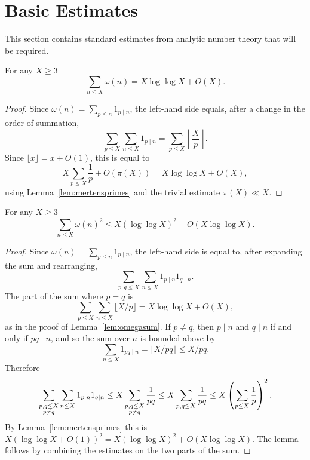 \chapter{Basic Estimates}
\label{chap:basic}

This section contains standard estimates from analytic number theory that will be required.

\begin{lemma}\label{lem:omegasum}
  \leanok
For any $X\geq 3$
\[\sum_{n\leq X}\omega(n) = X\log\log X+O(X).\]
\end{lemma}
\begin{proof}
  \leanok
Since $\omega(n) = \sum_{p\leq n}1_{p\mid n}$, the left-hand side equals, after a change in the order of summation,
\[\sum_{p\leq X}\sum_{n\leq X}1_{p\mid n} = \sum_{p\leq X}\left\lfloor\frac{X}{p}\right\rfloor.\]
Since $\lfloor x\rfloor=x+O(1)$, this is equal to
\[X\sum_{p\leq X}\frac{1}{p} +O(\pi(X)) = X\log\log X+O(X),\]
using Lemma~\ref{lem:mertensprimes} and the trivial estimate $\pi(X)\ll X$.
\end{proof}

\begin{lemma}\label{lem:omegasquaredsum}
  \leanok
For any $X\geq 3$
\[\sum_{n\leq X}\omega(n)^2 \leq X(\log\log X)^2+O(X\log\log X).\]
\end{lemma}
\begin{proof}
  \leanok
Since $\omega(n) = \sum_{p\leq n}1_{p\mid n}$, the left-hand side is equal to, after expanding the sum and rearranging,
\[\sum_{p,q\leq X}\sum_{n\leq X}1_{p\mid n}1_{q\mid n}.\]
The part of the sum where $p=q$ is
\[\sum_{p\leq X}\sum_{n\leq X}\lfloor X/p\rfloor = X\log\log X+O(X),\]
as in the proof of Lemma~\ref{lem:omegasum}. If $p\neq q$, then $p\mid n$ and $q\mid n$ if and only if $pq\mid n$, and so the sum over $n$ is bounded above by
\[\sum_{n\leq X}1_{pq\mid n}= \lfloor X/pq\rfloor \leq X/pq.\]
Therefore
\[\sum_{\substack{p,q\leq X\\ p\neq q}}\sum_{n\leq X}1_{p\mid n}1_{q\mid n}\leq X\sum_{\substack{p,q\leq X\\ p\neq q}}\frac{1}{pq}\leq X\sum_{p,q\leq X}\frac{1}{pq}\leq X\left( \sum_{p\leq X}\frac{1}{p}\right)^2.\]
By Lemma~\ref{lem:mertensprimes} this is $X(\log\log X+O(1))^2 = X(\log\log X)^2+O(X\log\log X)$. The lemma follows by combining the estimates on the two parts of the sum.
\end{proof}

